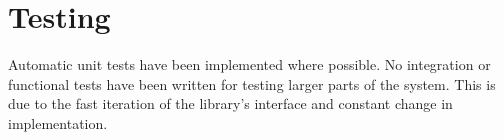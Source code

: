 \section{Testing}
\label{sec:testing}
Automatic unit tests have been implemented where possible. No integration or functional tests have been written for testing larger parts of the system. This is due to the fast iteration of the library's interface and constant change in implementation.
